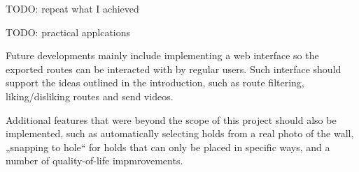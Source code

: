 


TODO: repeat what I achieved

TODO: practical applcations

Future developments mainly include implementing a web interface so the exported routes can be interacted with by regular users.
Such interface should support the ideas outlined in the introduction, such as route filtering, liking/disliking routes and send videos.

Additional features that were beyond the scope of this project should also be implemented, such as automatically selecting holds from a real photo of the wall, „snapping to hole“ for holds that can only be placed in specific ways, and a number of quality-of-life impmrovements.
